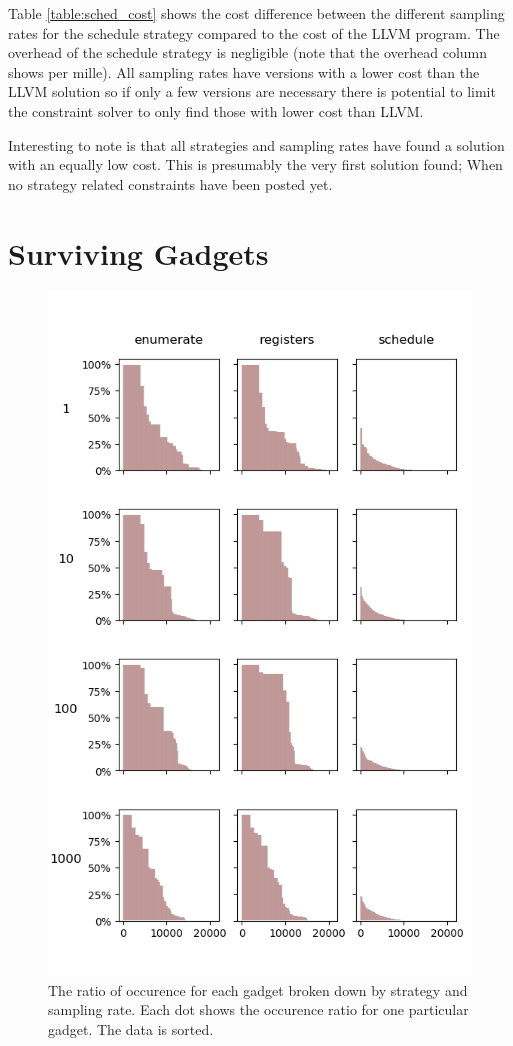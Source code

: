 Table \ref{table:sched_cost} shows the cost difference between the different sampling
rates for the schedule strategy compared to the cost of the LLVM program. The overhead of
the schedule strategy is negligible (note that the overhead column shows per mille). All
sampling rates have versions with a lower cost than the LLVM solution so if only a few
versions are necessary there is potential to limit the constraint solver to only find
those with lower cost than LLVM.

Interesting to note is that all strategies and sampling rates have found a solution with
an equally low cost. This is presumably the very first solution found; When no strategy
related constraints have been posted yet.

\section{Surviving Gadgets}

\begin{figure}[htp]
	\centering
	\includegraphics[width=\textwidth,height=\textheight]{results/figures/gadgets}
	\caption{The ratio of occurence for each gadget broken down by strategy and sampling rate.
Each dot shows the occurence ratio for one particular gadget. The data is sorted.}
	\label{fig:gadgets}
\end{figure}

